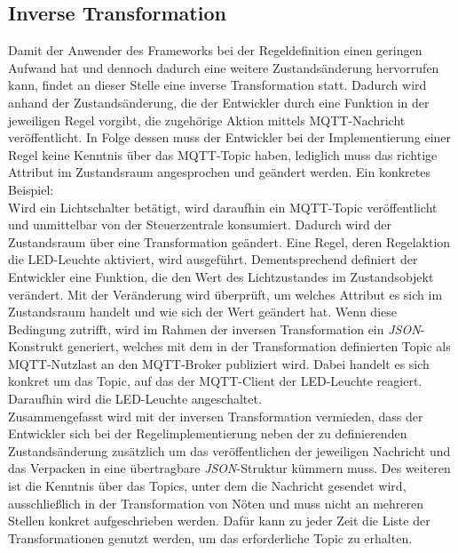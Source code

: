 \subsection{Inverse Transformation}
\label{subsec:inverseTransformation}
    Damit der Anwender des Frameworks bei der Regeldefinition einen geringen Aufwand hat und dennoch dadurch eine weitere 
    Zustandsänderung hervorrufen kann, findet an dieser Stelle eine inverse Transformation statt. Dadurch wird anhand 
    der Zustandsänderung, die der Entwickler durch eine Funktion in der jeweiligen Regel vorgibt, die zugehörige Aktion mittels \acs{MQTT}-Nachricht 
    veröffentlicht. In Folge dessen muss der Entwickler bei der Implementierung einer Regel keine Kenntnis über das 
    \acs{MQTT}-Topic haben, lediglich muss das richtige Attribut im Zustandsraum angesprochen und geändert werden. 
    Ein konkretes Beispiel: 
    \\
    \linebreak
    Wird ein Lichtschalter betätigt, wird daraufhin ein \acs{MQTT}-Topic veröffentlicht und unmittelbar von der Steuerzentrale 
    konsumiert. Dadurch wird der Zustandsraum über eine Transformation geändert. Eine Regel, deren Regelaktion die LED-Leuchte aktiviert, wird ausgeführt. 
    Dementsprechend definiert der Entwickler eine Funktion, die den Wert des Lichtzustandes im Zustandsobjekt verändert. 
    Mit der Veränderung wird überprüft, um welches Attribut es sich im Zustandsraum handelt und wie sich der Wert geändert hat. 
    Wenn diese Bedingung zutrifft, wird im Rahmen der inversen Transformation ein \textit{JSON}-Konstrukt generiert, welches 
    mit dem in der Transformation definierten Topic als \acs{MQTT}-Nutzlast an den \acs{MQTT}-Broker publiziert wird. Dabei handelt 
    es sich konkret um das Topic, auf das der \acs{MQTT}-Client der LED-Leuchte reagiert.
    Daraufhin wird die LED-Leuchte angeschaltet. 
    \\
    \linebreak
    Zusammengefasst wird mit der inversen Transformation vermieden, dass der Entwickler sich bei der Regelimplementierung neben der zu definierenden 
    Zustandsänderung zusätzlich um das veröffentlichen der jeweiligen Nachricht und das Verpacken in eine übertragbare 
    \textit{JSON}-Struktur kümmern muss. Des weiteren ist die Kenntnis über das Topics, unter dem die Nachricht 
    gesendet wird, ausschließlich in der Transformation von Nöten und muss nicht an mehreren Stellen konkret 
    aufgeschrieben werden. Dafür kann zu jeder Zeit die Liste der Transformationen genutzt werden, um das erforderliche Topic zu erhalten. 
